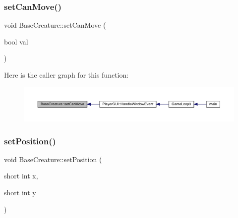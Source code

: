 \subsubsection{\texorpdfstring{set\+Can\+Move()}{setCanMove()}}
{\footnotesize\ttfamily void Base\+Creature\+::set\+Can\+Move (\begin{DoxyParamCaption}\item[{bool}]{val }\end{DoxyParamCaption})}

Here is the caller graph for this function\+:
\nopagebreak
\begin{figure}[H]
\begin{center}
\leavevmode
\includegraphics[width=350pt]{d2/d3b/class_base_creature_ad43564c6907562a3968ddc34a4d332a4_icgraph}
\end{center}
\end{figure}
\mbox{\label{class_base_creature_a00ffc1ee732a8f0a8921c9cee6842e4d}} 
\subsubsection{\texorpdfstring{set\+Position()}{setPosition()}}
{\footnotesize\ttfamily void Base\+Creature\+::set\+Position (\begin{DoxyParamCaption}\item[{short int}]{x,  }\item[{short int}]{y }\end{DoxyParamCaption})}

